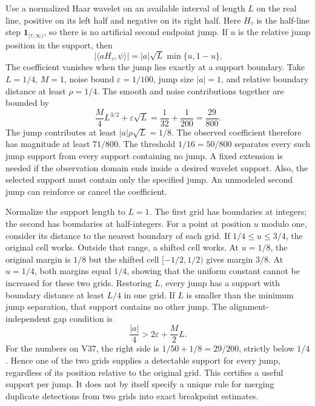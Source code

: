Use a normalized Haar wavelet on an available interval of length $L$ on the real line, positive on its left half and negative on its right half. Here $H_\tau$ is the half-line step $\mathbf1_{[\tau,\infty)}$, so there is no artificial second endpoint jump.
If $u$ is the relative jump position in the support, then
\[
|\langle aH_\tau,\psi\rangle|
=|a|\sqrt L\min\{u,1-u\}.
\]
The coefficient vanishes when the jump lies exactly at a support boundary.
Take $L=1/4$, $M=1$, noise bound $\varepsilon=1/100$, jump size $|a|=1$, and relative boundary distance at least $\rho=1/4$. The smooth and noise contributions together are bounded by
\[
\frac M4L^{3/2}+\varepsilon\sqrt L
=\frac1{32}+\frac1{200}=\frac{29}{800}.
\]
The jump contributes at least $|a|\rho\sqrt L=1/8$. The observed coefficient therefore has magnitude at least $71/800$. The threshold $1/16=50/800$ separates every such jump support from every support containing no jump.
A fixed extension is needed if the observation domain ends inside a desired wavelet support. Also, the selected support must contain only the specified jump. An unmodeled second jump can reinforce or cancel the coefficient.

Normalize the support length to $L=1$. The first grid has boundaries at integers; the second has boundaries at half-integers. For a point at position $u$ modulo one, consider its distance to the nearest boundary of each grid.
If $1/4\le u\le3/4$, the original cell works. Outside that range, a shifted cell works. At $u=1/8$, the original margin is $1/8$ but the shifted cell $[-1/2,1/2)$ gives margin $3/8$. At $u=1/4$, both margins equal $1/4$, showing that the uniform constant cannot be increased for these two grids.
Restoring $L$, every jump has a support with boundary distance at least $L/4$ in one grid. If $L$ is smaller than the minimum jump separation, that support contains no other jump.
The alignment-independent gap condition is
\[
\frac{|a|}{4}>2\varepsilon+\frac M2L.
\]
For the numbers on V37, the right side is $1/50+1/8=29/200$, strictly below $1/4$. Hence one of the two grids supplies a detectable support for every jump, regardless of its position relative to the original grid.
This certifies a useful support per jump. It does not by itself specify a unique rule for merging duplicate detections from two grids into exact breakpoint estimates.

